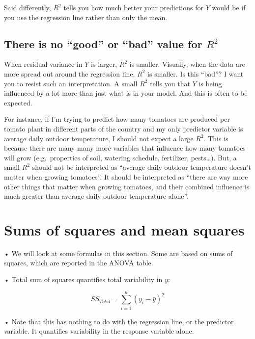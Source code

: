 \documentclass[
  letterpaper,
  DIV=11,
  numbers=noendperiod]{scrreprt}
\begin{document}
Said differently, \(R^2\) tells you how much better your predictions for
\(Y\) would be if you use the regression line rather than only the mean.

\hypertarget{there-is-no-good-or-bad-value-for-r2}{%
\subsection{\texorpdfstring{There is no ``good'' or ``bad'' value for
\(R^2\)}{There is no ``good'' or ``bad'' value for R\^{}2}}\label{there-is-no-good-or-bad-value-for-r2}}

When residual variance in \(Y\) is larger, \(R^2\) is smaller. Visually,
when the data are more spread out around the regression line, \(R^2\) is
smaller. Is this ``bad''? I want you to resist such an interpretation. A
small \(R^2\) tells you that \(Y\) is being influenced by a lot more
than just what is in your model. And this is often to be expected.

For instance, if I'm trying to predict how many tomatoes are produced
per tomato plant in different parts of the country and my only predictor
variable is average daily outdoor temperature, I should not expect a
large \(R^2\). This is because there are many many more variables that
influence how many tomatoes will grow (e.g.~properties of soil, watering
schedule, fertilizer, pests\ldots). But, a small \(R^2\) should not be
interpreted as ``average daily outdoor temperature doesn't matter when
growing tomatoes''. It should be interpreted as ``there are way more
other things that matter when growing tomatoes, and their combined
influence is much greater than average daily outdoor temperature
alone''.

\hypertarget{sums-of-squares-and-mean-squares}{%
\section{Sums of squares and mean
squares}\label{sums-of-squares-and-mean-squares}}

• We will look at some formulas in this section. Some are based on sums
of squares, which are reported in the ANOVA table.

• Total sum of squares quantifies total variability in \(y\):

\[
SS_{Total} = \sum^n_{i=1}(y_i - \bar{y})^2
\]

• Note that this has nothing to do with the regression line, or the
predictor variable. It quantifies variability in the response variable
alone.
\end{document}
